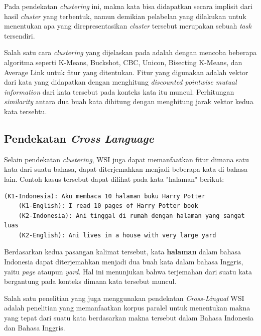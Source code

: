 	Pada pendekatan \textit{clustering} ini, makna kata bisa didapatkan secara implisit dari hasil \textit{cluster} yang terbentuk, namun demikian pelabelan yang dilakukan untuk menentukan apa yang direpresentasikan \textit{cluster} tersebut merupakan sebuah \textit{task} tersendiri.
	
	Salah satu cara \textit{clustering} yang dijelaskan pada \citep{pantel2002discovering} adalah dengan mencoba beberapa algoritma seperti K-Means, Buckshot, CBC, Unicon, Bisecting K-Means, dan Average Link untuk fitur yang ditentukan. Fitur yang digunakan adalah vektor dari kata yang didapatkan dengan menghitung \textit{discounted pointwise mutual information} dari kata tersebut pada konteks kata itu muncul. Perhitungan \textit{similarity} antara dua buah kata dihitung dengan menghitung jarak vektor kedua kata tersebtu.
	
	\subsection{Pendekatan \textit{Cross Language}}
	Selain pendekatan \textit{clustering}, WSI juga dapat memanfaatkan fitur dimana satu kata dari suatu bahasa, dapat diterjemahkan menjadi beberapa kata di bahasa lain. Contoh kasus tersebut dapat dilihat pada kata "halaman" berikut:

	\begin{lstlisting}[backgroundcolor = \color{white}]
	(K1-Indonesia): Aku membaca 10 halaman buku Harry Potter
	(K1-English): I read 10 pages of Harry Potter book
	(K2-Indonesia): Ani tinggal di rumah dengan halaman yang sangat luas
	(K2-English): Ani lives in a house with very large yard
	\end{lstlisting}
	
	Berdasarkan kedua pasangan kalimat tersebut, kata \textbf{halaman} dalam bahasa Indonesia dapat diterjemahkan menjadi dua buah kata dalam bahasa Inggris, yaitu \textit{page} ataupun \textit{yard}. Hal ini menunjukan bahwa terjemahan dari suatu kata bergantung pada konteks dimana kata tersebut muncul.
	
	Salah satu penelitian yang juga menggunakan pendekatan \textit{Cross-Lingual} WSI adalah penelitian \citep{septiantri2013wsd} yang memanfaatkan korpus paralel untuk menentukan makna yang tepat dari suatu kata berdasarkan makna tersebut dalam Bahasa Indonesia dan Bahasa Inggris.


